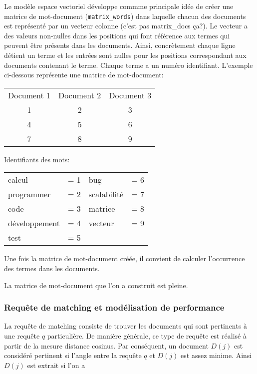 Le modèle espace vectoriel développe commme principale idée
de créer une matrice de mot-document ({\tt matrix\_words})
dans laquelle chacun des documents est représenté par
un vecteur colonne {\color{red} (c'est pas matrix\_docs ça?)}.
Le vecteur a des valeurs non-nulles dans les positions qui font
référence aux termes qui peuvent être présents dans les documents.
Ainsi, concrètement chaque ligne détient un terme et les entrées
sont nulles pour les positions correspondant aux documents
contenant le terme.
Chaque terme a un numéro identifiant.
L'exemple ci-dessous représente une matrice de mot-document:

\begin{center}
\begin{tabular}{ccc}
Document 1 & Document 2 & Document 3 \\
1          & 2          & 3 \\
4          & 5          & 6 \\
7          & 8          & 9
\end{tabular}
\end{center}

Identifiants des mots:

\begin{center}
\begin{tabular}{ll|ll}
calcul        & = 1 & bug         & = 6 \\
programmer    & = 2 & scalabilité & = 7 \\
code          & = 3 & matrice     & = 8 \\
développement & = 4 & vecteur     & = 9 \\
test          & = 5
\end{tabular}
\end{center}

Une fois la matrice de mot-document créée,
il convient de calculer l'occurrence des termes
dans les documents.

La matrice de mot-document que l'on a construit est pleine.

\subsubsection{Requête de matching et modélisation de performance}

La  requête de matching consiste de trouver les documents qui sont
pertinents à une requête $q$ particulière.
De manière générale, ce type de requête est réalisé à partir
de la mesure distance cosinus.
Par conséquent, un document $D(j)$ est considéré pertinent
si l'angle entre la requête $q$ et $D(j)$ est assez minime.
Ainsi $D(j)$ est extrait si l'on a

